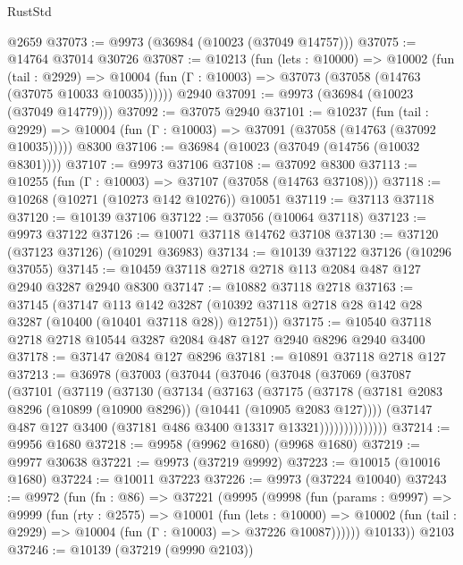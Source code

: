 \begin{lexlean}{RustStd}
\begin{coremodule}
    @2659
@37073 := @9973 (@36984 (@10023 (@37049 @14757)))
@37075 := @14764 @37014 @30726
@37087 := @10213
    (fun (lets : @10000) =>
    @10002
      (fun (tail : @2929) =>
      @10004 (fun (Γ : @10003) => @37073 (@37058 (@14763 (@37075 @10033 @10035))))))
    @2940
@37091 := @9973 (@36984 (@10023 (@37049 @14779)))
@37092 := @37075 @2940
@37101 := @10237
    (fun (tail : @2929) => @10004 (fun (Γ : @10003) => @37091 (@37058 (@14763 (@37092 @10035)))))
    @8300
@37106 := @36984 (@10023 (@37049 (@14756 (@10032 @8301))))
@37107 := @9973 @37106
@37108 := @37092 @8300
@37113 := @10255 (fun (Γ : @10003) => @37107 (@37058 (@14763 @37108)))
@37118 := @10268 (@10271 (@10273 @142 @10276)) @10051
@37119 := @37113 @37118
@37120 := @10139 @37106
@37122 := @37056 (@10064 @37118)
@37123 := @9973 @37122
@37126 := @10071 @37118 @14762 @37108
@37130 := @37120 (@37123 @37126) (@10291 @36983)
@37134 := @10139 @37122 @37126 (@10296 @37055)
@37145 := @10459 @37118 @2718 @2718 @113 @2084 @487 @127 @2940 @3287 @2940 @8300
@37147 := @10882 @37118 @2718
@37163 := @37145
    (@37147
      @113
      @142
      @3287
      (@10392 @37118 @2718 @28 @142 @28 @3287 (@10400 (@10401 @37118 @28)) @12751))
@37175 := @10540 @37118 @2718 @2718 @10544 @3287 @2084 @487 @127 @2940 @8296 @2940 @3400
@37178 := @37147 @2084 @127 @8296
@37181 := @10891 @37118 @2718 @127
@37213 := @36978
    (@37003
      (@37044
        (@37046
          (@37048
            (@37069
              (@37087
                (@37101
                  (@37119
                    (@37130
                      (@37134
                        (@37163
                          (@37175
                            (@37178
                              (@37181
                                @2083
                                @8296
                                (@10899 (@10900 @8296))
                                (@10441 (@10905 @2083 @127))))
                            (@37147 @487 @127 @3400 (@37181 @486 @3400 @13317 @13321))))))))))))))
@37214 := @9956 @1680
@37218 := @9958 (@9962 @1680) (@9968 @1680)
@37219 := @9977 @30638
@37221 := @9973 (@37219 @9992)
@37223 := @10015 (@10016 @1680)
@37224 := @10011 @37223
@37226 := @9973 (@37224 @10040)
@37243 := @9972
    (fun (fn : @86) =>
    @37221
      (@9995
        (@9998
          (fun (params : @9997) =>
          @9999
            (fun (rty : @2575) =>
            @10001
              (fun (lets : @10000) =>
              @10002 (fun (tail : @2929) => @10004 (fun (Γ : @10003) => @37226 @10087))))))
        @10133))
    @2103
@37246 := @10139 (@37219 (@9990 @2103))

\end{coremodule}
\end{lexlean}
